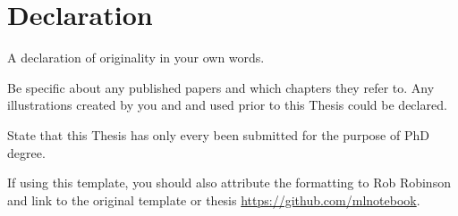 \thispagestyle{empty}
\chapter*{Declaration}

A declaration of originality in your own words.

Be specific about any published papers and which chapters they refer to. Any illustrations created by you and and used prior to this Thesis could be declared.

State that this Thesis has only every been submitted for the purpose of PhD degree.

If using this template, you should also attribute the formatting to Rob Robinson \parencite{robinson2020thesis} and link to the original template or thesis \url{https://github.com/mlnotebook}.